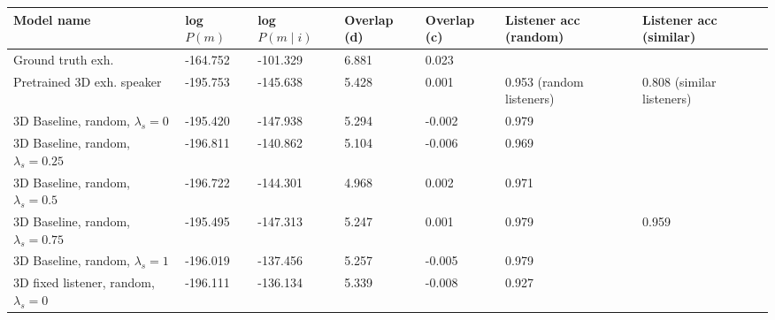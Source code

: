\begin{table}[] 
	\begin{tabularx}{\textwidth}{|X|l|l|X|X|X|X|}
		\hline
		\textbf{Model name}                                    & \textbf{log $P(m)$} & \textbf{log $P(m \mid i)$} & \textbf{Overlap (d)} & \textbf{Overlap (c)} & \textbf{Listener acc (random)} & \textbf{Listener acc (similar)} \\ \hline
		Ground truth exh.       &      -164.752            &         -101.329               &       6.881             &      0.023               &                 &                \\ \hline
		Pretrained 3D exh. speaker                            &       -195.753            &         -145.638               &        5.428              &      0.001                & 0.953 (random listeners)                 & 0.808 (similar listeners)                 \\ \hline
		3D Baseline, random, $\lambda_s = 0$ &       -195.420            &    -147.938                    &           5.294            &      -0.002                &                 0.979                         &                                           \\ \hline
		3D Baseline, random, $\lambda_s = 0.25$     &     -196.811              &       -140.862                 &          5.104            &       -0.006               &          0.969                                &                                           \\ \hline
		3D Baseline, random, $\lambda_s = 0.5$   &         -196.722          &        -144.301                &        4.968              &          0.002            &                  0.971                      &                                           \\ \hline
		3D Baseline, random, $\lambda_s = 0.75$  &       -195.495        &           -147.313           &          5.247            &         0.001             & 0.979                                    &                        0.959                   \\ \hline
		3D Baseline, random, $\lambda_s = 1$   &      -196.019             &            -137.456             &        5.257              &          -0.005            &              0.979                            &                                           \\ \hline
		3D fixed listener, random, $\lambda_s = 0$&      -196.111          &     -136.134                  &             5.339         &         -0.008            &                   0.927                      &                                           \\ \hline

\end{tabularx}
\end{table}
